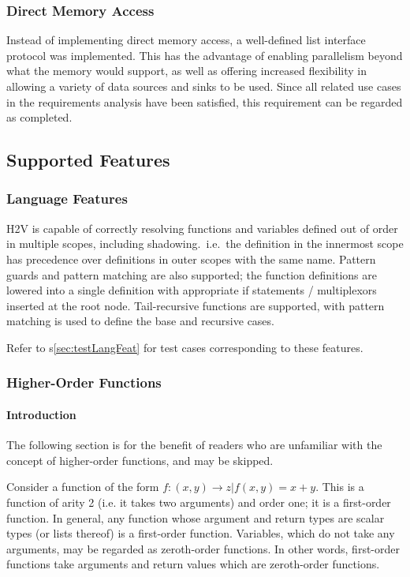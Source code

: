 \documentclass[english,onecolumn]{scrartcl}
\begin{document}
\subsubsection{Direct Memory Access}
\label{sec:reqDMA}
Instead of implementing direct memory access, a well-defined list interface protocol was implemented. This has the advantage of
enabling parallelism beyond what the memory would support, as well as offering increased flexibility in allowing a variety of data
sources and sinks to be used. Since all related use cases in the requirements analysis have been satisfied, this requirement can
be regarded as completed.


\subsection{Supported Features}

\subsubsection{Language Features}
H2V is capable of correctly resolving functions and variables defined out of order in multiple scopes, including shadowing.\ i.e.\ the
definition in the innermost scope has precedence over definitions in outer scopes with the same name. Pattern guards and pattern
matching are also supported; the function definitions are lowered into a single definition with appropriate if statements /
multiplexors inserted at the root node. Tail-recursive functions are supported, with pattern matching is used to define the base and
recursive cases.

Refer to s\ref{sec:testLangFeat} for test cases corresponding to these features.


\subsubsection{Higher-Order Functions}
\paragraph{Introduction}
The following section is for the benefit of readers who are unfamiliar with the concept of higher-order functions, and may be
skipped.

Consider a function of the form \(f:(x, y) \rightarrow z | f(x, y) = x + y\). This is a function of arity 2 (i.e. it takes two arguments) and
order one; it is a first-order function. In general, any function whose argument and return types are scalar types (or lists
thereof) is a first-order function. Variables, which do not take any arguments, may be regarded as zeroth-order functions.
In other words, first-order functions take arguments and return values which are zeroth-order functions.
\end{document}
